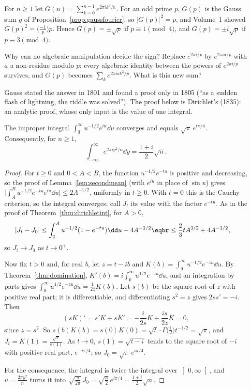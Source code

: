 For $n\ge1$ let $G(n)=\sum_{k=0}^{n-1}e^{2\pi ik^2/n}$. For an odd prime $p$, $G(p)$ is the Gauss sum $g$ of Proposition~\ref{prop:gaussfourier}, so $|G(p)|^2=p$, and
Volume~1 showed $G(p)^2=\bigl(\frac{-1}p\bigr)p$. Hence $G(p)=\pm\sqrt p$ if $p\equiv1\pmod4$, and $G(p)=\pm i\sqrt p$ if $p\equiv3\pmod4$.

\begin{think}
Why can no algebraic manipulation decide the sign? Replace $e^{2\pi i/p}$ by $e^{2\pi ia/p}$ with $a$ a non-residue modulo $p$: every algebraic
identity between the powers of $e^{2\pi i/p}$ survives, and $G(p)$ becomes $\sum_ke^{2\pi iak^2/p}$. What is this new sum?
\end{think}

Gauss stated the answer in 1801 and found a proof only in 1805 (``as a sudden flash of lightning, the riddle was solved'').
The proof below is Dirichlet's (1835): an analytic proof, whose only input is the value of one integral.

\begin{lemma}\label{lem:fresnel}
The improper integral $\int_0^\infty u^{-1/2}e^{iu}\dd u$ converges and equals $\sqrt\pi\,e^{i\pi/4}$. Consequently, for $n\ge1$,
\[
\int_{-\infty}^\infty e^{2\pi iy^2/n}\dd y=\frac{1+i}2\sqrt n.
\]
\end{lemma}
\begin{proof}
For $t\ge0$ and $0<A<B$, the function $u^{-1/2}e^{-tu}$ is positive and decreasing, so the proof of Lemma~\ref{lem:secondmean} (with $e^{iu}$ in place of
$\sin u$) gives $\bigl|\int_A^Bu^{-1/2}e^{-tu}e^{iu}\dd u\bigr|\le2A^{-1/2}$, uniformly in $t\ge0$. With $t=0$ this is the Cauchy criterion, so the integral converges;
call $J_t$ its value with the factor $e^{-tu}$. As in the proof of Theorem~\ref{thm:dirichletint}, for $A>0$,
\[
\begin{aligned}|J_t-J_0|&\le\int_0^Au^{-1/2}(1-e^{-tu})\dd u+4A^{-1/2}\eqbr\le\frac23tA^{3/2}+4A^{-1/2},\end{aligned}
\]
so $J_t\to J_0$ as $t\to0^+$.

Now fix $t>0$ and, for real $b$, let $z=t-ib$ and $K(b)=\int_0^\infty u^{-1/2}e^{-zu}\dd u$. By Theorem~\ref{thm:domination}, $K'(b)=i\int_0^\infty u^{1/2}e^{-zu}\dd u$, and
an integration by parts gives $\int_0^\infty u^{1/2}e^{-zu}\dd u=\frac1{2z}K(b)$. Let $s(b)$ be the square root of $z$ with positive real part; it is
differentiable, and differentiating $s^2=z$ gives $2ss'=-i$. Then
\[
(sK)'=s'K+sK'=-\frac i{2s}K+\frac{is}{2z}K=0,
\]
since $z=s^2$. So $s(b)K(b)=s(0)K(0)=\sqrt t\cdot\Gamma\bigl(\frac12\bigr)t^{-1/2}=\sqrt\pi$, and $J_t=K(1)=\frac{\sqrt\pi}{s(1)}$. As $t\to0$, $s(1)=\sqrt{t-i}$ tends to the square root
of $-i$ with positive real part, $e^{-i\pi/4}$; so $J_0=\sqrt\pi\,e^{i\pi/4}$.

For the consequence, the integral is twice the integral over $\left]0,\infty\right[$, and $u=\frac{2\pi y^2}n$ turns it into
$\sqrt{\frac n{2\pi}}\,J_0=\sqrt{\frac n2}\,e^{i\pi/4}=\frac{1+i}2\sqrt n$.
\end{proof}

